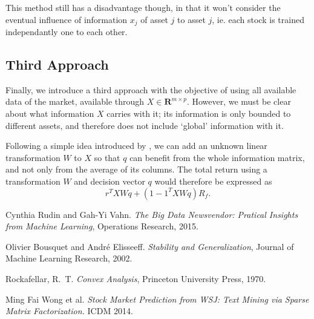 \documentclass[11pt]{article}
\newcommand{\real}{\bm R}
\theoremstyle{plain}
\theoremstyle{definition}
\begin{document}
This method still has a disadvantage though, in that it won't consider the eventual
influence of information $x_j$ of asset $j$ to asset $j$, ie. each stock is trained
independantly one to each other.

\subsection{Third Approach}

Finally, we introduce a third approach with the objective of using all available data of
the market, available through $X\in\real^{m\times p}$. However, we must be clear about
what information $X$ carries with it; its information is only bounded to different
assets, and therefore does not include `global' information with it.

Following a simple idea introduced by \cite{wsj}, we can add an unknown linear
transformation $W$ to $X$ so that $q$ can benefit from the whole information matrix, and
not only from the average of its columns. The total return using a transformation $W$ and
decision vector $q$ would therefore be expressed as
\begin{equation}
  r^{T}XWq + (1 - 1^{T}XWq)R_f.
\end{equation}

\begin{thebibliography}{99}

  Cynthia Rudin and Gah-Yi Vahn. \textit{The Big Data Newsvendor: Pratical Insights from
    Machine Learning}, Operations Research, 2015.

  Olivier Bousquet and André Elisseeff. \textit{Stability and Generalization}, Journal of
  Machine Learning Research, 2002.

  Rockafellar, R.~T. \emph{Convex Analysis}, Princeton University Press, 1970.

 Ming Fai Wong et al. \emph{Stock Market Prediction from WSJ: Text Mining via
    Sparse Matrix Factorization.} ICDM 2014. 

\end{thebibliography}
\end{document}
